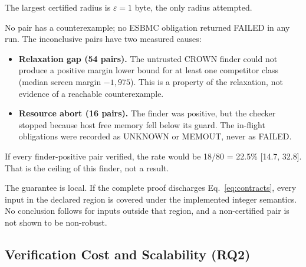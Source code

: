 The largest certified radius is $\varepsilon = 1$ byte, the only radius attempted.

No pair has a counterexample; no ESBMC obligation returned FAILED in any run. The inconclusive pairs have two measured causes:
\begin{itemize}
  \item \textbf{Relaxation gap (54 pairs).} The untrusted CROWN finder could not produce a positive margin lower bound for at least one competitor class (median screen margin $-1{,}975$). This is a property of the relaxation, not evidence of a reachable counterexample.
  \item \textbf{Resource abort (16 pairs).} The finder was positive, but the checker stopped because host free memory fell below its guard. The in-flight obligations were recorded as UNKNOWN or MEMOUT, never as FAILED.
\end{itemize}
If every finder-positive pair verified, the rate would be 18/80 = 22.5\% [14.7, 32.8]. That is the ceiling of this finder, not a result.

The guarantee is local. If the complete proof discharges Eq.~\eqref{eq:contracts}, every input in the declared region is covered under the implemented integer semantics. No conclusion follows for inputs outside that region, and a non-certified pair is not shown to be non-robust.

\subsection{Verification Cost and Scalability (RQ2)}

